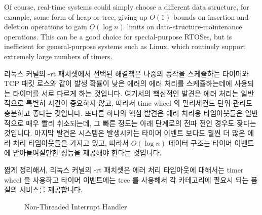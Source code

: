 Of course, real-time systems could simply choose a different data
structure, for example, some form of heap or tree, giving up
$O(1)$ bounds on insertion and deletion operations to gain $O(\log n)$
limits on data-structure-maintenance operations.
This can be a good choice for special-purpose RTOSes, but is inefficient
for general-purpose systems such as Linux, which routinely support
extremely large numbers of timers.
\fi

리눅스 커널의 -rt 패치셋에서 선택된 해결책은 나중의 동작을 스케쥴하는 타이머와
TCP 패킷 로스와 같이 발생 확률이 낮은 에러의 에러 처리를 스케쥴하는데에
사용되는 타이머를 서로 다르게 하는 것입니다.
여기서의 핵심적인 발견은 에러 처리는 일반적으로 특별히 시간이 중요하지 않고,
따라서 time wheel 의 밀리세컨드 단위 관리도 충분하고 좋다는 것입니다.
또다른 하나의 핵심 발견은 에러 처리용 타임아웃들은 일반적으로 매우 빨리
취소되는데, 그 빠른 정도는 아래 단계로의 전파 전인 경우도 잦다는 것입니다.
마지막 발견은 시스템은 발생시키는 타이머 이벤트 보다도 훨씬 더 많은 에러 처리
타임아웃들을 가지고 있고, 따라서 $O(\log n)$ 데이터 구조는 타이머 이벤트에
받아들여질만한 성능을 제공해야 한다는 것입니다.

짧게 정리해서, 리눅스 커널의 -rt 패치셋은 에러 처리 타임아웃에 대해서는 timer
wheel 을 사용하고 타이머 이벤트에는 tree 를 사용해서 각 카테고리에 필요시 되는
품질의 서비스를 제공합니다.

\begin{figure}[tb]
\centering
{}
\caption{Non-Threaded Interrupt Handler}
\label{fig:advsync:Non-Threaded Interrupt Handler}
\end{figure}

